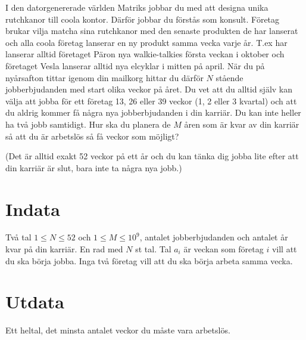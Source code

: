 I den datorgenererade världen Matriks jobbar du med att designa unika rutchkanor till coola kontor. Därför jobbar du förstås som konsult. 
Företag brukar vilja matcha sina rutchkanor med den senaste produkten de har lanserat och alla coola företag lanserar en ny produkt samma vecka varje år. T.ex har lanserar alltid företaget Päron nya walkie-talkies första veckan i oktober och företaget Vesla lanserar alltid nya elcyklar i mitten på april.
När du på nyårsafton tittar igenom din mailkorg hittar du därför $N$ stående jobberbjudanden med start olika veckor på året. Du vet att du alltid själv kan välja att jobba för ett företag 13, 26 eller 39 veckor (1, 2 eller 3 kvartal) och att du aldrig kommer få några nya jobberbjudanden i din karriär. Du kan inte heller ha två jobb samtidigt.
Hur ska du planera de $M$ åren som är kvar av din karriär så att du är arbetslös så få veckor som möjligt?

(Det är alltid exakt 52 veckor på ett år och du kan tänka dig jobba lite efter att din karriär är slut, bara inte ta några nya jobb.)

\section*{Indata}
Två tal $1 \leq N \leq 52$ och $1 \leq M \leq 10^9$, antalet jobberbjudanden och antalet år kvar på din karriär. 
En rad med $N$ st tal. Tal $a_i$ är veckan som företag $i$ vill att du ska börja jobba. Inga två företag vill att du ska börja arbeta samma vecka.

\section*{Utdata}
Ett heltal, det minsta antalet veckor du måste vara arbetslös. 
